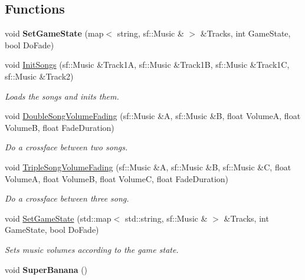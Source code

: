 \subsection*{Functions}
\begin{DoxyCompactItemize}
\item 
\hypertarget{namespace_chase_game_af423e47c7318b7eeb67ff1f1a6b1547d}{void {\bfseries Set\-Game\-State} (map$<$ string, sf\-::\-Music \& $>$ \&Tracks, int Game\-State, bool Do\-Fade)}\label{namespace_chase_game_af423e47c7318b7eeb67ff1f1a6b1547d}

\item 
void \hyperlink{namespace_chase_game_af1b7d4727ff31281f8efdf46175e94c3}{Init\-Songs} (sf\-::\-Music \&Track1\-A, sf\-::\-Music \&Track1\-B, sf\-::\-Music \&Track1\-C, sf\-::\-Music \&Track2)
\begin{DoxyCompactList}\small\item\em Loads the songs and inits them. \end{DoxyCompactList}\item 
void \hyperlink{namespace_chase_game_a1fafa6862bb2df06c93d286361fefaa4}{Double\-Song\-Volume\-Fading} (sf\-::\-Music \&A, sf\-::\-Music \&B, float Volume\-A, float Volume\-B, float Fade\-Duration)
\begin{DoxyCompactList}\small\item\em Do a crossface between two songs. \end{DoxyCompactList}\item 
void \hyperlink{namespace_chase_game_a3b9e1d486d981f5332d23142eb4777b7}{Triple\-Song\-Volume\-Fading} (sf\-::\-Music \&A, sf\-::\-Music \&B, sf\-::\-Music \&C, float Volume\-A, float Volume\-B, float Volume\-C, float Fade\-Duration)
\begin{DoxyCompactList}\small\item\em Do a crossface between three song. \end{DoxyCompactList}\item 
void \hyperlink{namespace_chase_game_ac628bcb1f9de7ece2d9705ea5c6e9e91}{Set\-Game\-State} (std\-::map$<$ std\-::string, sf\-::\-Music \& $>$ \&Tracks, int Game\-State, bool Do\-Fade)
\begin{DoxyCompactList}\small\item\em Sets music volumes according to the game state. \end{DoxyCompactList}\item 
\hypertarget{namespace_chase_game_a19b95183bbaf6684ffc6511a4f9922f5}{void {\bfseries Super\-Banana} ()}\label{namespace_chase_game_a19b95183bbaf6684ffc6511a4f9922f5}


\end{DoxyCompactItemize}
